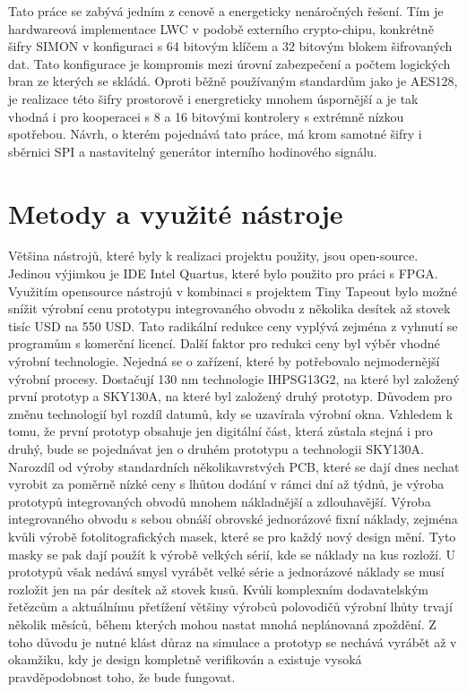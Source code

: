 Tato práce se zabývá jedním z cenově a energeticky nenáročných řešení. Tím je hardwareová implementace LWC v podobě externího crypto-chipu, konkrétně šifry SIMON v konfiguraci
s 64 bitovým klíčem a 32 bitovým blokem šifrovaných dat. Tato konfigurace je kompromis mezi úrovní zabezpečení a počtem logických bran ze kterých se skládá.
Oproti běžně používaným standardům jako je AES128, je realizace této šifry prostorově i energreticky mnohem úspornější \cite{Diehl2017} a je tak vhodná
i pro kooperacei s 8 a 16 bitovými kontrolery s extrémně nízkou spotřebou. Návrh, o kterém pojednává tato práce, má krom samotné šifry i sběrnici SPI a nastavitelný generátor interního hodinového signálu.

\chapter{Metody a využité nástroje}\label{chap:main}
Většina nástrojů, které byly k realizaci projektu použity, jsou open-source. Jedinou výjimkou je IDE Intel Quartus, které bylo použito pro práci s FPGA. Využitím opensource nástrojů v kombinaci s projektem Tiny Tapeout \cite{Venn2024} bylo možné snížit výrobní cenu prototypu integrovaného obvodu z několika desítek až stovek tisíc USD na 550 USD.
Tato radikální redukce ceny vyplývá zejména z vyhnutí se programům s komerční licencí. Další faktor pro redukci ceny byl výběr vhodné výrobní technologie. Nejedná se o zařízení, které by potřebovalo nejmodernější výrobní procesy. Dostačují 130 nm technologie IHPSG13G2, na které byl založený první prototyp a SKY130A, na které byl založený druhý prototyp. Důvodem pro změnu technologií byl rozdíl datumů, kdy se uzavírala výrobní okna.
Vzhledem k tomu, že první prototyp obsahuje jen digitální část, která zůstala stejná i pro druhý, bude se pojednávat jen o druhém prototypu a technologii SKY130A. Narozdíl od výroby standardních několikavrstvých PCB, které se dají dnes nechat vyrobit za poměrně nízké ceny s lhůtou dodání v rámci dní až týdnů, je výroba prototypů integrovaných obvodů mnohem nákladnější a zdlouhavější. 
Výroba integrovaného obvodu s sebou obnáší obrovské jednorázové fixní náklady, zejména kvůli výrobě fotolitografických masek, které se pro každý nový design mění. Tyto masky se pak dají použít k výrobě velkých sérií, kde se náklady na kus rozloží. U prototypů však nedává smysl vyrábět velké série a jednorázové náklady se musí rozložit jen na pár desítek až stovek kusů. Kvůli komplexním dodavatelským řetězcům a aktuálnímu přetížení většiny výrobců polovodičů výrobní lhůty trvají několik měsíců, během kterých mohou nastat mnohá neplánovaná zpoždění. Z toho důvodu je nutné klást důraz na simulace a prototyp se nechává vyrábět až v okamžiku, kdy je design kompletně verifikován a existuje vysoká pravděpodobnost toho, že bude fungovat. 

